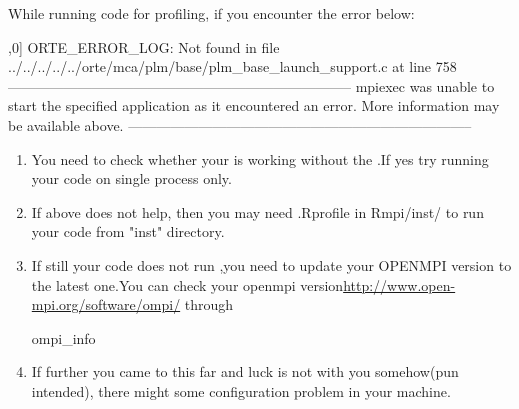 \begin{problem}
While running  code for profiling, if you 
encounter the error below:
\begin{Output}
[G:12221] [[39704,0],0] ORTE_ERROR_LOG: Not found in file ../../../../../orte/mca/plm/base/plm_base_launch_support.c at line 758
--------------------------------------------------------------------------
mpiexec was unable to start the specified application as it encountered an error.
More information may be available above.
--------------------------------------------------------------------------
\end{Output}  
\end{problem}

\begin{solution}
\begin{enumerate}
\item You need to check whether your  is working without the .If yes try running your  code on single process only.
\item If above does not help, then you may need .Rprofile in Rmpi/inst/ to run your code from "inst" directory.
\item If still your code does not run ,you need to update your OPENMPI version to the latest one.You can check your openmpi version\url{http://www.open-mpi.org/software/ompi/} through 
\begin{Output}
ompi_info
\end{Output}
\item If further you came to this far and luck is not with you somehow(pun intended), there might some configuration problem in your machine.
\end{enumerate}  
\end{solution}



